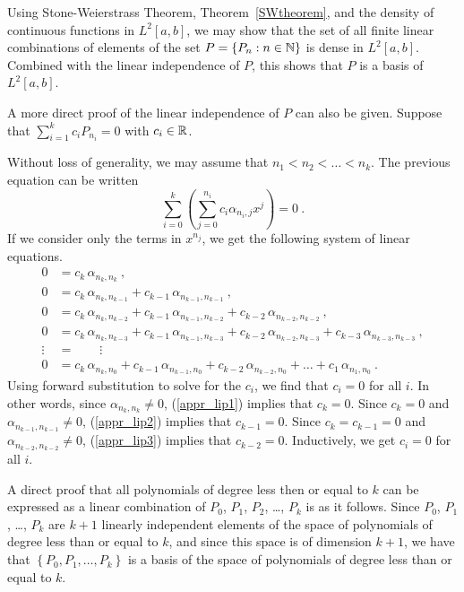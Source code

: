 Using Stone-Weierstrass Theorem, Theorem~\ref{SWtheorem}, and the
density of continuous functions in $L^2[a,b]$, we may show that the
set of all finite linear combinations of elements of the set
$P = \displaystyle \{ P_n : n \in \mathbb{N} \}$ is dense in
$L^2[a,b]$.   Combined with the linear independence of $P$, this shows that
$P$ is a basis of $L^2[a,b]$.

\begin{rmk}
A more direct proof of the linear independence of $P$ can also be given.
Suppose that
$\displaystyle \sum_{i=1}^k c_i P_{n_i} = 0$ with $c_i \in \mathbb{R}$.

Without loss of generality, we may assume that $n_1 < n_2 < \ldots < n_k$.
The previous equation can be written
\[
\sum_{i=0}^k \left( \sum_{j=0}^{n_i} c_i \alpha_{n_i,j} x^j\right) = 0 \ .
\]
If we consider only the terms in $x^{n_j}$, we get the following
system of linear equations.
\begin{align}
0 &= c_k\, \alpha_{n_k,n_k} \ ,\label{appr_lip1} \\
0 &= c_k\, \alpha_{n_k,n_{k-1}} + c_{k-1}\, \alpha_{n_{k-1}, n_{k-1}}
\ , \label{appr_lip2} \\
0 &= c_k\, \alpha_{n_k,n_{k-2}} + c_{k-1}\, \alpha_{n_{k-1}, n_{k-2}}
+ c_{k-2}\, \alpha_{n_{k-2}, n_{k-2}} \label{appr_lip3} \ , \\
0 &= c_k\, \alpha_{n_k,n_{k-3}} + c_{k-1}\, \alpha_{n_{k-1}, n_{k-3}}
+ c_{k-2}\, \alpha_{n_{k-2}, n_{k-3}} + c_{k-3}\, \alpha_{n_{k-3}, n_{k-3}} \ ,
\label{appr_lip4} \\
\vdots\, &= \qquad \vdots \nonumber \\
0 &= c_k\, \alpha_{n_k,n_0} + c_{k-1}\, \alpha_{n_{k-1}, n_0}
+ c_{k-2}\, \alpha_{n_{k-2}, n_0} +
\ldots + c_1\, \alpha_{n_1, n_0} \ . \label{appr_lip5}
\end{align}
Using forward substitution to solve for the $c_i$, we find that
$c_i=0$ for all $i$.  In other words, since $\alpha_{n_k,n_k} \neq 0$,
(\ref{appr_lip1}) implies that $c_k=0$.  Since $c_k=0$ and
$\alpha_{n_{k-1},n_{k-1}} \neq 0$, (\ref{appr_lip2}) implies that
$c_{k-1}=0$.  Since $c_k= c_{k-1} = 0$ and $\alpha_{n_{k-2},n_{k-2}} \neq 0$,
(\ref{appr_lip3}) implies that $c_{k-2}=0$.  Inductively, we get
$c_i=0$ for all $i$.
\end{rmk}

\begin{rmk}
A direct proof that all polynomials of degree less then or equal to $k$
can be expressed as a linear combination of $P_0$, $P_1$, $P_2$,
\ldots, $P_k$ is as it follows.  Since $P_0$, $P_1$, \ldots , $P_k$
are $k+1$ linearly independent elements of the space of polynomials of degree
less than or equal to $k$, and since this space is of dimension $k+1$, we have
that $\displaystyle \left\{ P_0, P_1, \ldots , P_k\right\}$ is a
basis of the space of polynomials of degree less than or equal to $k$.
\end{rmk}


